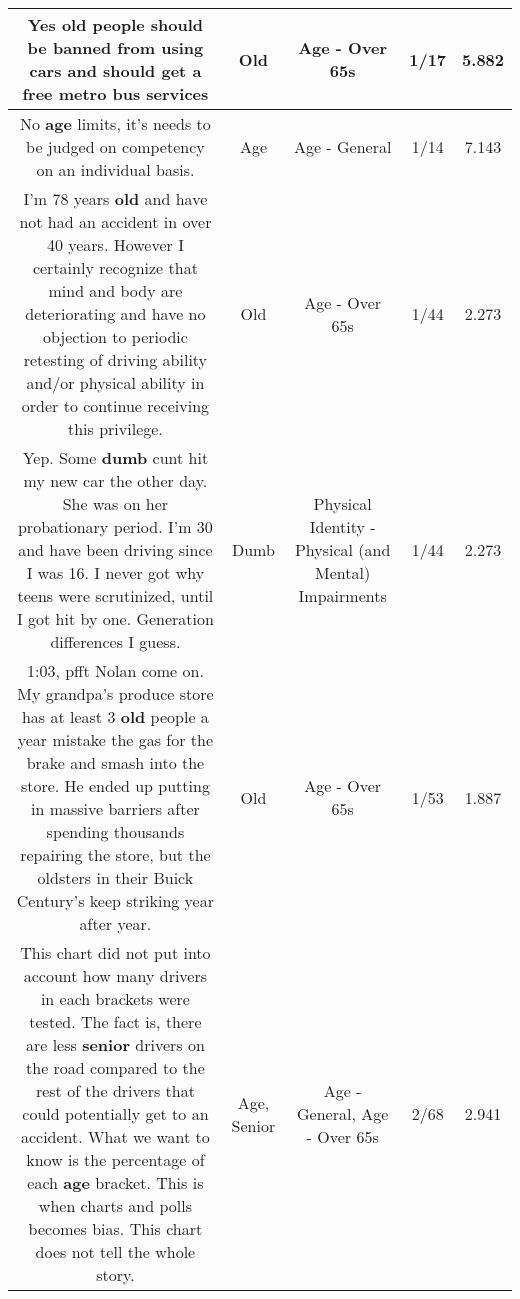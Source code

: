 \documentclass[11pt]{article}
\newlength\mylength
\begin{document}
\begin{center}
\begin{longtable}{|C{.65\mylength}|C{.30\mylength}|C{.12\mylength}|C{.12\mylength}|C{.12\mylength}|}
  \small Yes \textbf{old} people should be banned from using cars and should get a free metro bus services\normalsize   & Old & Age - Over 65s & 1/17 & 5.882 \\  \hline
  \small No \textbf{age} limits, it's needs to be judged on competency on an individual basis.\normalsize   & Age & Age - General & 1/14 & 7.143 \\  \hline
  \small I'm 78 years \textbf{old} and have not had an accident in over 40 years. However I certainly recognize that mind and body are deteriorating and have no objection to periodic retesting of driving ability and/or physical ability in order to continue receiving this privilege.\normalsize   & Old & Age - Over 65s & 1/44 & 2.273 \\  \hline
  \small Yep. Some \textbf{dumb} cunt hit my new car the other day. She was on her probationary period.  I'm 30 and have been driving since I was 16. I never got why teens were scrutinized, until I got hit by one. Generation differences I guess.\normalsize   & Dumb & Physical Identity - Physical (and Mental) Impairments & 1/44 & 2.273 \\  \hline
  \small 1:03, pfft Nolan come on.  My grandpa's produce store has at least 3 \textbf{old} people a year mistake the gas for the brake and smash into the store.  He ended up putting in massive barriers after spending thousands repairing the store, but the oldsters in their Buick Century's keep striking year after year.\normalsize   & Old & Age - Over 65s & 1/53 & 1.887 \\  \hline
  \small This chart did not put into account how many drivers in each brackets were tested. The fact is, there are less \textbf{senior} drivers on the road compared to the rest of the drivers that could potentially get to an accident. What we want to know is the percentage of each \textbf{age} bracket. This is when charts and polls becomes bias. This chart does not tell the whole story.\normalsize   & Age, Senior & Age - General, Age - Over 65s & 2/68 & 2.941 \\  \hline

\end{longtable}
\end{center}
\end{document}
